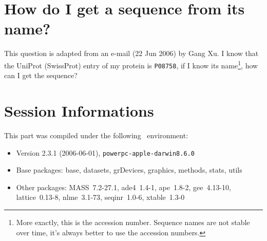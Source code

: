 \documentclass{article}
\begin{document}
\section{How do I get a sequence from its name?}

This question is adapted from an e-mail (22 Jun 2006) by Gang Xu.
I know that the UniProt (SwissProt) entry of my protein is \texttt{P08758},
if I know its name\footnote{
More exactly, this is the accession number. Sequence names are not stable over time,
it's always better to use the accession numbers. 
}, how can I get the sequence?

\begin{Schunk}
\end{Schunk}

\section{Session Informations}

This part was compiled under the following \Rlogo{}~environment:

\begin{itemize}
  \item Version 2.3.1 (2006-06-01), \verb|powerpc-apple-darwin8.6.0|
  \item Base packages: base, datasets, grDevices, graphics, methods,
    stats, utils
  \item Other packages: MASS~7.2-27.1, ade4~1.4-1, ape~1.8-2,
    gee~4.13-10, lattice~0.13-8, nlme~3.1-73, seqinr~1.0-6,
    xtable~1.3-0
\end{itemize}

\clearpage
{}


\end{document}
